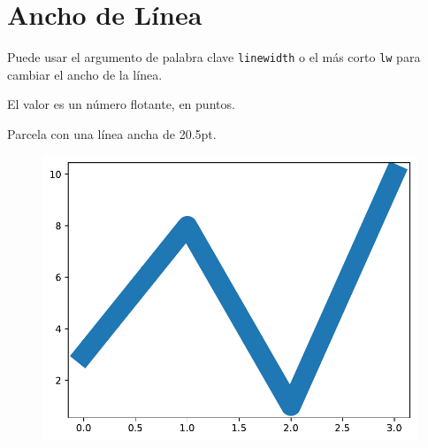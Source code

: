 \section{Ancho de Línea}

Puede usar el argumento de palabra clave \texttt{linewidth} o el más
corto \texttt{lw} para cambiar el ancho de la línea.

El valor es un número flotante, en puntos.

\begin{code} Parcela con una línea ancha de 20.5pt.

\begin{Shaded}
\begin{Highlighting}[]

\OperatorTok{=}\NormalTok{ np.array([}\NormalTok{, }\NormalTok{, }\NormalTok{, }\NormalTok{])}

\OperatorTok{=} \StringTok{\textquotesingle{}20.5\textquotesingle{}}\NormalTok{)}
\end{Highlighting}
\end{Shaded}

\begin{figure}
  \centering
  \includegraphics[scale=0.6]{img/grafica1020.pdf}
\end{figure}
\end{code}


